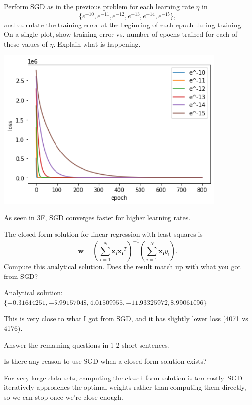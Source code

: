 \begin{problem}[2]
  Perform SGD as in the previous problem for each learning rate $\eta$ in \[\{e^{-10}, e^{-11}, e^{-12}, e^{-13}, e^{-14}, e^{-15}\},\] and calculate the training error at the beginning of each epoch during training.  On a single plot, show training error vs. number of epochs trained for each of these values of $\eta$. Explain what is happening.
\end{problem}
\begin{solution}
  
  \includegraphics[height=8cm]{images/3h.png}

  As seen in 3F, SGD converges faster for higher learning rates.
\end{solution}


\begin{problem}[2]
  The closed form solution for linear regression with least squares is \[\mathbf{w} = \left(\sum_{i=1}^N \mathbf{x_i}\mathbf{x_i}^T\right)^{-1}\left(\sum_{i=1}^N \mathbf{x_i}y_i\right).\]  Compute this analytical solution.  Does the result match up with what you got from SGD?
\end{problem}
\begin{solution}
  Analytical solution: $\{-0.31644251, -5.99157048, 4.01509955, -11.93325972, 8.99061096\}$

  This is very close to what I got from SGD, and it has slightly lower loss (4071 vs 4176).
\end{solution}

Answer the remaining questions in 1-2 short sentences.

\begin{problem}[2]
  Is there any reason to use SGD when a closed form solution exists?
\end{problem}
\begin{solution}
  For very large data sets, computing the closed form solution is too costly.
  SGD iteratively approaches the optimal weights rather than computing them directly, so we can stop once we're close enough.
\end{solution}

